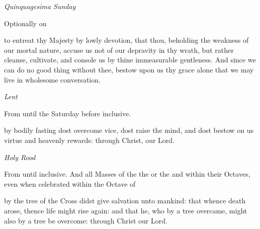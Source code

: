 \begin{multicols}{2}
\centerline{\textit{Quinquagesima Sunday}}
\begin{rubric}
	Optionally on 
\end{rubric}
 to entreat thy Majesty by lowly devotion, that thou, beholding the weakness of our mortal nature, accuse us not of our depravity in thy wrath, but rather cleanse, cultivate, and console us by thine immeasurable gentleness. And since we can do no good thing without thee, bestow upon us thy grace alone that we may live in wholesome conversation.\\


\vspace{-1ex}

\centerline{\textit{Lent}}
\begin{rubric}
	From  until the Saturday before  inclusive.
\end{rubric}
 by bodily fasting dost overcome vice, dost raise the mind, and dost bestow on us virtue and heavenly rewards: through Christ, our Lord.\\

\vspace{-1ex}

\centerline{\textit{Holy Rood}}
\begin{rubric}
	From  until  inclusive. And all Masses of the  the  or the  and within their Octaves, even when celebrated within the Octave of 
\end{rubric}
 by the tree of the Cross didst give salvation unto mankind: that whence death arose, thence life might rise again: and that he, who by a tree overcame, might also by a tree be overcome: through Christ our Lord.


\end{multicols}
